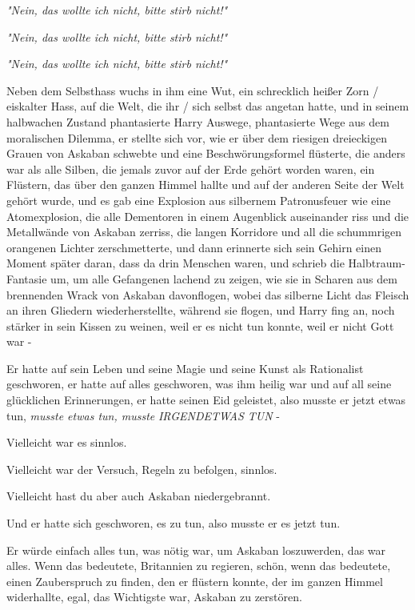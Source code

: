 {\emph{"Nein, das wollte ich nicht, bitte stirb nicht!"}

\emph{"Nein, das wollte ich nicht, bitte stirb nicht!"}

\emph{"Nein, das wollte ich nicht, bitte stirb nicht!"}

Neben dem Selbsthass wuchs in ihm eine Wut, ein schrecklich heißer Zorn / eiskalter Hass, auf die Welt, die ihr / sich selbst das angetan hatte, und in seinem halbwachen Zustand phantasierte Harry Auswege, phantasierte Wege aus dem moralischen Dilemma, er stellte sich vor, wie er über dem riesigen dreieckigen Grauen von Askaban schwebte und eine Beschwörungsformel flüsterte, die anders war als alle Silben, die jemals zuvor auf der Erde gehört worden waren, ein Flüstern, das über den ganzen Himmel hallte und auf der anderen Seite der Welt gehört wurde, und es gab eine Explosion aus silbernem Patronusfeuer wie eine Atomexplosion, die alle Dementoren in einem Augenblick auseinander riss und die Metallwände von Askaban zerriss, die langen Korridore und all die schummrigen orangenen Lichter zerschmetterte, und dann erinnerte sich sein Gehirn einen Moment später daran, dass da drin Menschen waren, und schrieb die Halbtraum-Fantasie um, um alle Gefangenen lachend zu zeigen, wie sie in Scharen aus dem brennenden Wrack von Askaban davonflogen, wobei das silberne Licht das Fleisch an ihren Gliedern wiederherstellte, während sie flogen, und Harry fing an, noch stärker in sein Kissen zu weinen, weil er es nicht tun konnte, weil er nicht Gott war -

Er hatte auf sein Leben und seine Magie und seine Kunst als Rationalist geschworen, er hatte auf alles geschworen, was ihm heilig war und auf all seine glücklichen Erinnerungen, er hatte seinen Eid geleistet, also musste er jetzt etwas tun, \emph{musste etwas tun, musste} \emph{IRGENDETWAS TUN} -

Vielleicht war es sinnlos.

Vielleicht war der Versuch, Regeln zu befolgen, sinnlos.

Vielleicht hast du aber auch Askaban niedergebrannt.

Und er hatte sich geschworen, es zu tun, also musste er es jetzt tun.

Er würde einfach alles tun, was nötig war, um Askaban loszuwerden, das war alles. Wenn das bedeutete, Britannien zu regieren, schön, wenn das bedeutete, einen Zauberspruch zu finden, den er flüstern konnte, der im ganzen Himmel widerhallte, egal, das Wichtigste war, Askaban zu zerstören.

}
